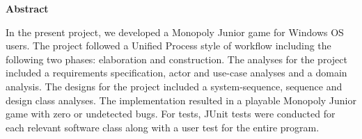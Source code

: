 \begin{flushleft} %

\begin{center}
    \vspace{0.9cm}
    \textbf{Abstract}
\end{center}
\doublespacing

In the present project, we developed a Monopoly Junior game for Windows OS users. The project followed a Unified Process style of workflow including the following two phases: elaboration and construction. The analyses for the project included a requirements specification, actor and use-case analyses and a domain analysis. The designs for the project included a system-sequence, sequence and design class analyses. The implementation resulted in a playable Monopoly Junior game with zero or undetected bugs. For tests, JUnit tests were conducted for each relevant software class along with a user test for the entire program. 

\end{flushleft}